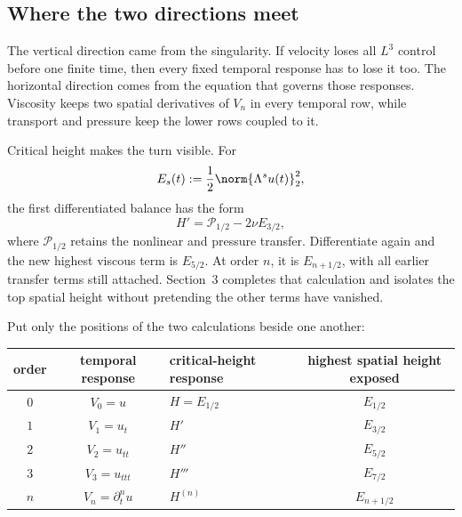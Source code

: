 \subsection{Where the two directions meet}\label{sub:ThePressureCompleteMixedDerivativeTower}

The vertical direction came from the singularity.
If velocity loses all \(L^3\) control before one finite time, then every fixed temporal response has to lose it too.
The horizontal direction comes from the equation that governs those responses.
Viscosity keeps two spatial derivatives of \(V_n\) in every temporal row, while transport and pressure keep the lower rows coupled to it.

Critical height makes the turn visible.
For
\[
  E_s(t):=\frac12\norm{\Lambda^su(t)}_2^2,
\]
the first differentiated balance has the form
\[
  H'
  =
  \mathcal P_{1/2}
  -2\nu E_{3/2},
\]
where \(\mathcal P_{1/2}\) retains the nonlinear and pressure transfer.
Differentiate again and the new highest viscous term is \(E_{5/2}\).
At order \(n\), it is \(E_{n+1/2}\), with all earlier transfer terms still attached.
Section~3 completes that calculation and isolates the top spatial height without pretending the other terms have vanished.

Put only the positions of the two calculations beside one another:
\begin{center}
\captionsetup{hypcap=false}
\label{tab:BodyTemporalSpatialDiscovery}
\small
\renewcommand{\arraystretch}{1.4}
\begin{tabularx}{\textwidth}{@{}c c >{\raggedright\arraybackslash}X c@{}}
\toprule
order & temporal response & critical-height response & highest spatial height exposed \\
\midrule
\(0\) & \(V_0=u\) & \(H=E_{1/2}\) & \(E_{1/2}\) \\
\(1\) & \(V_1=u_t\) & \(H'\) & \(E_{3/2}\) \\
\(2\) & \(V_2=u_{tt}\) & \(H''\) & \(E_{5/2}\) \\
\(3\) & \(V_3=u_{ttt}\) & \(H'''\) & \(E_{7/2}\) \\
\(n\) & \(V_n=\partial_t^nu\) & \(H^{(n)}\) & \(E_{n+1/2}\) \\
\bottomrule
\end{tabularx}
\end{center}

